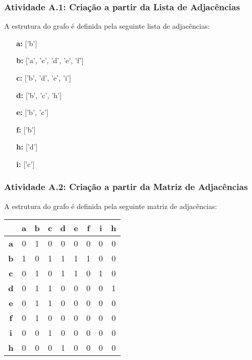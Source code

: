 \documentclass[a4paper,12pt]{article}
\begin{document}
\subsubsection*{Atividade A.1: Criação a partir da Lista de Adjacências}
A estrutura do grafo é definida pela seguinte lista de adjacências:
\begin{itemize}[leftmargin=*]
    \item[\textbf{a:}] ['b']
    \item[\textbf{b:}] ['a', 'c', 'd', 'e', 'f']
    \item[\textbf{c:}] ['b', 'd', 'e', 'i']
    \item[\textbf{d:}] ['b', 'c', 'h']
    \item[\textbf{e:}] ['b', 'c']
    \item[\textbf{f:}] ['b']
    \item[\textbf{h:}] ['d']
    \item[\textbf{i:}] ['c']
\end{itemize}

\subsubsection*{Atividade A.2: Criação a partir da Matriz de Adjacências}
A estrutura do grafo é definida pela seguinte matriz de adjacências:
\begin{center}
\scriptsize
\begin{tabular*}{\textwidth}{c|@{\extracolsep{\fill}}cccccccc}
\rowcolor[gray]{0.9}
 & \textbf{a} & \textbf{b} & \textbf{c} & \textbf{d} & \textbf{e} & \textbf{f} & \textbf{i} & \textbf{h} \\
\hline
\textbf{a} & 0 & 1 & 0 & 0 & 0 & 0 & 0 & 0 \\
\textbf{b} & 1 & 0 & 1 & 1 & 1 & 1 & 0 & 0 \\
\textbf{c} & 0 & 1 & 0 & 1 & 1 & 0 & 1 & 0 \\
\textbf{d} & 0 & 1 & 1 & 0 & 0 & 0 & 0 & 1 \\
\textbf{e} & 0 & 1 & 1 & 0 & 0 & 0 & 0 & 0 \\
\textbf{f} & 0 & 1 & 0 & 0 & 0 & 0 & 0 & 0 \\
\textbf{i} & 0 & 0 & 1 & 0 & 0 & 0 & 0 & 0 \\
\textbf{h} & 0 & 0 & 0 & 1 & 0 & 0 & 0 & 0 \\
\end{tabular*}
\end{center}
\end{document}
